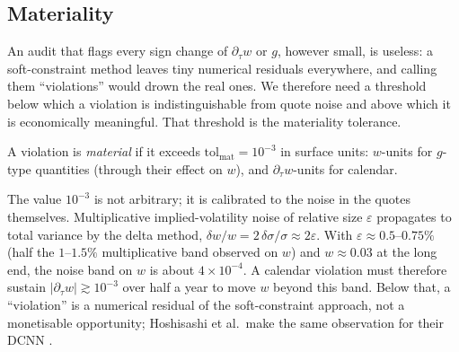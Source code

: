 

\subsection{Materiality}
An audit that flags every sign change of $\partial_\tau w$ or $g$, however small, is useless: a
soft-constraint method leaves tiny numerical residuals everywhere, and calling them
``violations'' would drown the real ones. We therefore need a threshold below which a violation
is indistinguishable from quote noise and above which it is economically meaningful. That
threshold is the materiality tolerance.

\begin{definition}\label{def:materiality}
A violation is \emph{material} if it exceeds $\mathrm{tol}_{\mathrm{mat}}=10^{-3}$ in surface
units: $w$-units for $g$-type quantities (through their effect on $w$), and
$\partial_\tau w$-units for calendar.
\end{definition}

The value $10^{-3}$ is not arbitrary; it is calibrated to the noise in the quotes themselves.
Multiplicative implied-volatility noise of relative size $\varepsilon$ propagates to total
variance by the delta method, $\delta w/w = 2\,\delta\sigma/\sigma \approx 2\varepsilon$. With
$\varepsilon\approx0.5$--$0.75\%$ (half the $1$--$1.5\%$ multiplicative band observed on $w$) and
$w\approx0.03$ at the long end, the noise band on $w$ is about $4\times10^{-4}$. A calendar
violation must therefore sustain $|\partial_\tau w|\gtrsim10^{-3}$ over half a year to move $w$
beyond this band. Below that, a ``violation'' is a numerical residual of the soft-constraint
approach, not a monetisable opportunity; Hoshisashi et al.\ make the same observation for their
DCNN \cite{hoshisashi2023}.

